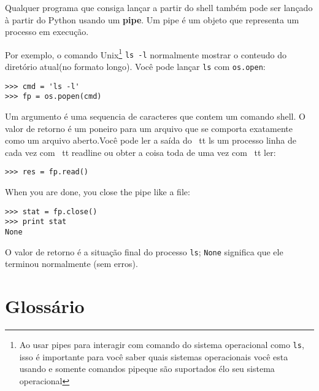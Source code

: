 
Qualquer programa que consiga lançar a partir do shell também pode ser
lançado à partir do Python usando um {\bf pipe}. Um pipe é um objeto
que representa um processo em execução.


Por exemplo, o comando Unix\footnote{Ao usar pipes para interagir com comando do sistema operacional como  {\tt ls},
isso é importante para você saber quais sistemas operacionais você esta usando e somente comandos pipeque
são suportados élo seu sistema operacional }
{\tt ls -l} normalmente mostrar o conteudo do diretório atual(no formato longo). 
Você pode lançar {\tt ls} com {\tt os.open}:


\begin{verbatim}
>>> cmd = 'ls -l'
>>> fp = os.popen(cmd)
\end{verbatim}

%

Um argumento é uma sequencia de caracteres que contem um comando shell. O
valor de retorno  é um poneiro para um arquivo que se comporta exatamente como um arquivo
aberto.Você pode ler a saída do {\ tt ls} um processo
linha de cada vez com {\ tt readline} ou obter a coisa toda de
uma vez com {\ tt ler}:


\begin{verbatim}
>>> res = fp.read()
\end{verbatim}

%
When you are done, you close the pipe like a file:


\begin{verbatim}
>>> stat = fp.close()
>>> print stat
None
\end{verbatim}

%
O valor de retorno é a situação final do processo {\tt ls};
{\tt None} significa que ele terminou normalmente (sem erros).

\section{Glossário}

